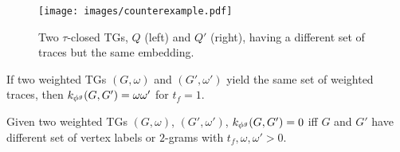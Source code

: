 \begin{figure}[!t]
	\vspace*{-0.5cm}
	\centering
	\texttt{[image: images/counterexample.pdf]}
	\caption{Two $\tau$-closed TGs, $Q$ (left) and $Q'$ (right), having a different set of traces but the same embedding.}\label{fig:counterexample}
\end{figure}

\begin{lemma}
	\label{we}
	If two weighted TGs $(G,\omega)$ and $(G',\omega')$ yield the same set of weighted traces, then
	$k_{{\phi^{g}}}(G,G')=\omega\omega'$ for $t_f=1$.
\end{lemma}



\begin{lemma}
	\label{lem:sdiss}
	Given two weighted TGs $(G,\omega)$, $(G',\omega')$, $k_{{\phi^{g}}}(G,G')=0$ iff $G$ and $G'$ have different set
	of vertex labels or $2$-grams with $t_f,\omega,\omega'>0$.
\end{lemma}




